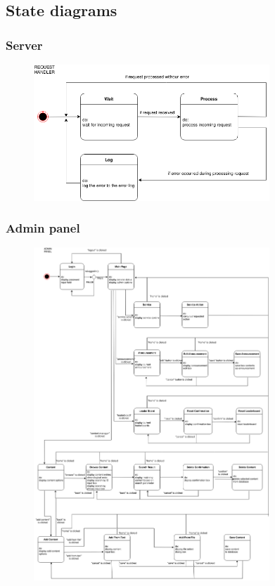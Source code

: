 \documentclass{article}
\begin{document}
\subsection{State diagrams}

\subsubsection{Server}

\begin{figure}[h]
	\centering
	\includegraphics[width=0.79\textwidth]{state_diagram_server.png}
\end{figure}

\subsubsection{Admin panel}

\begin{figure}[h]
	\centering
	\includegraphics[width=0.79\textwidth]{state_diagram_admin.png}
\end{figure}
\end{document}

